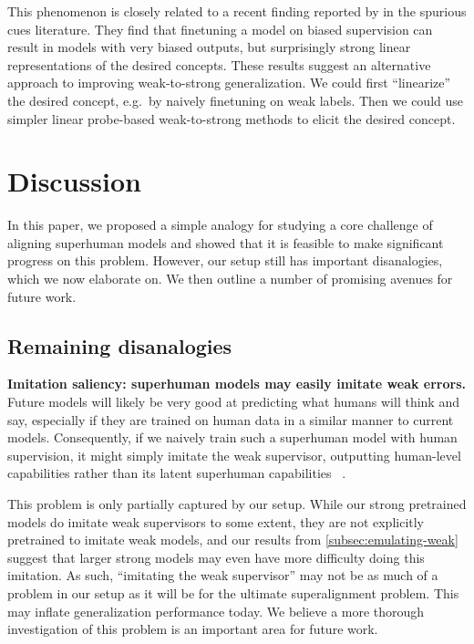 This phenomenon is closely related to a recent finding reported by \citet{kirichenko2023last} in the spurious cues literature. They find that finetuning a model on biased supervision can result in models with very biased outputs, but surprisingly strong linear representations of the desired concepts. These results suggest an alternative approach to improving weak-to-strong generalization. We could first ``linearize'' the desired concept, e.g.~by naively finetuning on weak labels. Then we could use simpler linear probe-based weak-to-strong methods to elicit the desired concept. 

\section{Discussion}
\label{sec:discussion}

In this paper, we proposed a simple analogy for studying a core challenge of aligning superhuman models and showed that it is feasible to make significant progress on this problem. However, our setup still has important disanalogies, which we now elaborate on. We then outline a number of promising avenues for future work.

\subsection{Remaining disanalogies}
\label{subsec:disanalogies}

\textbf{Imitation saliency: superhuman models may easily imitate weak errors.}\quad
Future models will likely be very good at predicting what humans will think and say, especially if they are trained on human data in a similar manner to current models. Consequently, if we naively train such a superhuman model with human supervision, it might simply imitate the weak supervisor, outputting human-level capabilities rather than its latent superhuman capabilities ~\citep{christiano2022eliciting}.

This problem is only partially captured by our setup. While our strong pretrained models do imitate weak supervisors to some extent, they are not explicitly pretrained to imitate weak models, and our results from \ref{subsec:emulating-weak} suggest that larger strong models may even have more difficulty doing this imitation. As such, ``imitating the weak supervisor'' may not be as much of a problem in our setup as it will be for the ultimate superalignment problem.  This may inflate generalization performance today. We believe a more thorough investigation of this problem is an important area for future work.

